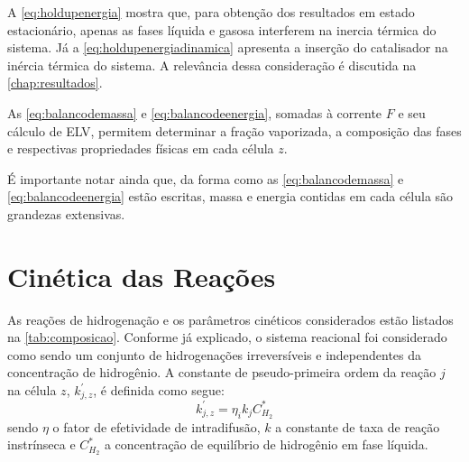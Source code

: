 A \autoref{eq:holdupenergia} mostra que, para obtenção dos resultados em estado
estacionário, apenas as fases líquida e gasosa interferem na inercia térmica do
sistema. Já a \autoref{eq:holdupenergiadinamica} apresenta a inserção do
catalisador na inércia térmica do sistema. A relevância dessa consideração é
discutida na \autoref{chap:resultados}.


As \autoref{eq:balancodemassa} e \autoref{eq:balancodeenergia}, somadas à
corrente $F$ e seu cálculo de ELV, permitem determinar a fração vaporizada,
a composição das fases e respectivas propriedades físicas em cada célula $z$.

É importante notar ainda que, da forma como as \autoref{eq:balancodemassa} e
\autoref{eq:balancodeenergia} estão escritas, massa e energia contidas em cada
célula são grandezas extensivas. 

\section{Cinética das Reações} \label{sec:cineticadasreacoes}

As reações de hidrogenação e os parâmetros cinéticos considerados estão
listados na \autoref{tab:composicao}. Conforme já explicado, o sistema reacional
foi considerado como sendo um conjunto de hidrogenações irreversíveis e
independentes da concentração de hidrogênio. A constante de pseudo-primeira
ordem da reação $j$ na célula $z$, $k^{'}_{j,z}$, é definida como segue:
\begin{equation}
k^{'}_{j,z} = \eta_ik_jC^{*}_{H_2}
\label{eq:constantepseudoprimeiraordem}
\end{equation}
sendo $\eta$ o fator de efetividade de intradifusão, $k$ a
constante de taxa de reação instrínseca e $C^{*}_{H_2}$ a concentração de
equilíbrio de hidrogênio em fase líquida.


